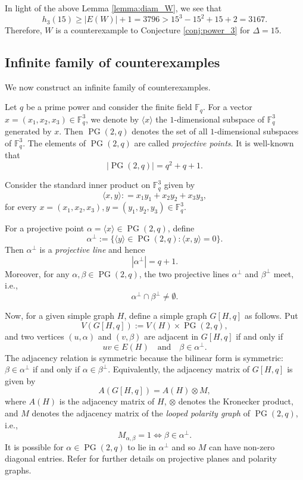 \documentclass[11pt]{article}
\theoremstyle{plain}
\numberwithin{equation}{section}
\DeclareMathOperator{\PG}{PG}
\begin{document}
In light of the above Lemma \ref{lemma:diam_W}, we see that
\[h_3(15)\ge |E(W)|+ 1 = 3796 > 15^3-15^2+15+2 = 3167.\]
Therefore, $W$ is a counterexample to Conjecture \ref{conj:power_3} for $\Delta = 15$. 

\subsection{Infinite family of counterexamples}

We now construct an infinite family of counterexamples.

Let $q$ be a prime power and consider the finite field $\mathbb{F}_q$. For a vector $x = (x_1,x_2,x_3)\in \mathbb{F}_q^3$, we denote by $\langle x\rangle$ the $1$-dimensional subspace of $\mathbb{F}_q^3$ generated by $x$. Then $\PG(2,q)$ denotes the set of all $1$-dimensional subspaces of $\mathbb{F}_q^3$. The elements of $\PG(2,q)$ are called \emph{projective points}. It is well-known that 
\[|\PG(2,q)|=q^2+q+1.\]

Consider the standard inner product on $\mathbb{F}_q^3$ given by
\[
        \langle x,y\rangle : =x_1y_1+x_2y_2+x_3y_3,
\]
for every $x = (x_1, x_2, x_3), y = (y_1, y_2, y_3) \in \mathbb{F}_q^3$.

For a projective point $\alpha = \langle x \rangle \in \PG(2,q)$, define 
\[
        \alpha^\perp:=\{\langle y\rangle\in \PG(2,q):\langle x,y\rangle=0\}.
\]
Then $\alpha^\perp$ is a \emph{projective line} and hence
\[
        |\alpha^\perp|=q+1.
\]
Moreover, for any $\alpha, \beta\in \PG(2,q)$, the two projective lines $\alpha^\perp$ and $\beta^\perp$ meet, i.e.,
\[
        \alpha^\perp\cap \beta^\perp\ne \emptyset.
\]

Now, for a given simple graph $H$, define a simple graph $G[H,q]$ as follows. Put
\[
        V(G[H,q]):=V(H)\times \PG(2,q),
\]
and two vertices $(u,\alpha)$ and $(v,\beta)$ are adjacent in $G[H,q]$ if and only if
\[
        uv \in E(H)
        \quad\text{and}\quad
        \beta\in \alpha^\perp.
\]
The adjacency relation is symmetric because the bilinear form is symmetric:
$\beta\in \alpha^\perp$ if and only if $\alpha\in \beta^\perp$.
Equivalently, the adjacency matrix of $G[H,q]$ is given by 
\[ A(G[H,q]) = A(H)\otimes M,\]
where $A(H)$ is the adjacency matrix of $H$, $\otimes$ denotes the Kronecker product, and $M$ denotes the adjacency matrix of the \emph{looped polarity graph} of $\PG(2,q)$, i.e.,
\[ M_{\alpha, \beta} = 1 \iff \beta \in \alpha^\perp.\]
It is possible for $\alpha \in \PG(2,q)$ to lie in $\alpha^\perp$ and so $M$ can have non-zero diagonal entries. Refer \cite{Cameron_1992, Bachraty_Siran_2015} for further details on projective planes and polarity graphs.
\end{document}
